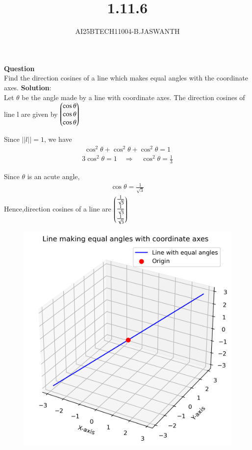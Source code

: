 \documentclass[journal]{IEEEtran}
\begin{document}

\vspace{3cm}


\renewcommand{\thetable}{\theenumi}




\vspace{3cm}


\title{1.11.6}
\author{AI25BTECH11004-B.JASWANTH}
{\let\newpage\relax\maketitle}


\renewcommand{\thefigure}{\theenumi}
\renewcommand{\thetable}{\theenumi}
\setlength{\intextsep}{10pt} %

\textbf{Question}\\
Find the direction cosines of a line which makes equal angles with the coordinate axes. 
\textbf{Solution}:\\ 

Let $\theta$ be the angle made by a line with coordinate axes.  
The direction cosines of line l are given by  
$\begin{pmatrix} \cos\theta \\ \cos\theta \\ \cos\theta\end{pmatrix}$    

Since $||l|| = 1$, we have
\begin{align}
\cos^2 \theta + \cos^2 \theta + \cos^2 \theta = 1    
\end{align}
\begin{align}
3 \cos^2 \theta = 1 \quad \Rightarrow \quad \cos^2 \theta = \tfrac{1}{3}    
\end{align}


Since $\theta$ is an acute angle,
\begin{align}
\cos \theta = \frac{1}{\sqrt{3}}
\end{align}
Hence,direction cosines of a line are 
$\begin{pmatrix}\tfrac{1}{\sqrt{3}} \\ \tfrac{1}{\sqrt{3}} \\ \tfrac{1}{\sqrt{3}}\end{pmatrix}$

\begin{figure}[H]
    \centering
	\includegraphics[width=0.5\columnwidth]{figs/01.png}
    \label{fig-1}
\end{figure}
\end{document}
